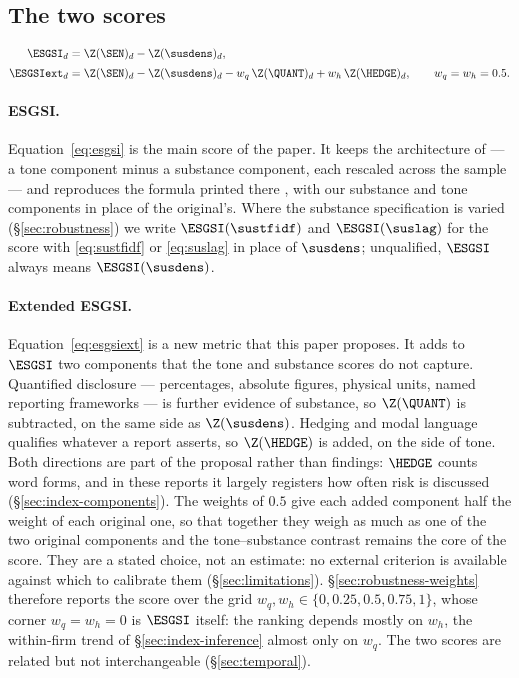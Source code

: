\subsection{The two scores}
\label{sec:index-composite}

\begin{align}
\label{eq:esgsi}
\ESGSI_d    &= \Z(\SEN)_d - \Z(\susdens)_d, \\[2pt]
\label{eq:esgsiext}
\ESGSIext_d &= \Z(\SEN)_d - \Z(\susdens)_d - w_q\,\Z(\QUANT)_d + w_h\,\Z(\HEDGE)_d,
\qquad w_q = w_h = 0.5 .
\end{align}

\paragraph{ESGSI.} Equation~\eqref{eq:esgsi} is the main score of the paper.
It keeps the architecture of \citet{lagasio2024} --- a tone component minus a
substance component, each rescaled across the sample --- and reproduces the
formula printed there \citep[p.~4]{lagasio2024}, with our substance and tone
components in place of the original's. Where the substance specification is
varied (\S\ref{sec:robustness}) we write $\ESGSI(\sustfidf)$ and
$\ESGSI(\suslag)$ for the score with \eqref{eq:sustfidf} or
\eqref{eq:suslag} in place of $\susdens$; unqualified, $\ESGSI$ always means
$\ESGSI(\susdens)$.

\paragraph{Extended ESGSI.} Equation~\eqref{eq:esgsiext} is a new metric that
this paper proposes. It adds to $\ESGSI$ two components that the tone and
substance scores do not capture. Quantified disclosure --- percentages,
absolute figures, physical units, named reporting frameworks --- is further
evidence of substance, so $\Z(\QUANT)$ is subtracted, on the same side as
$\Z(\susdens)$. Hedging and modal language qualifies whatever a report
asserts, so $\Z(\HEDGE)$ is added, on the side of tone. Both directions are
part of the proposal rather than findings: $\HEDGE$ counts word forms, and in
these reports it largely registers how often risk is discussed
(\S\ref{sec:index-components}). The weights of $0.5$ give each added
component half the weight of each original one, so that together they weigh
as much as one of the two original components and the tone--substance
contrast remains the core of the score. They are a stated choice, not an
estimate: no external criterion is available against which to calibrate them
(\S\ref{sec:limitations}). \S\ref{sec:robustness-weights} therefore reports
the score over the grid $w_q, w_h \in \{0, 0.25, 0.5, 0.75, 1\}$, whose corner
$w_q = w_h = 0$ is $\ESGSI$ itself: the ranking depends mostly on $w_h$, the
within-firm trend of \S\ref{sec:index-inference} almost only on $w_q$. The two
scores are related but not interchangeable (\S\ref{sec:temporal}).

